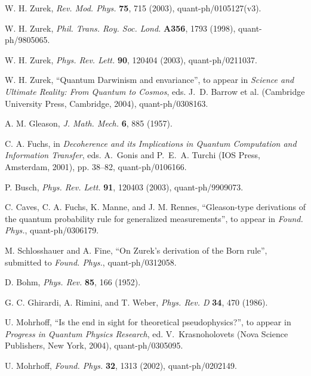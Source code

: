 \documentclass[12pt]{article}
\begin{document}
\begin{thebibliography}{00}
\setlength{\parskip}{0pt}
\vspace*{-15pt}
W. H. Zurek, {\it Rev. Mod. Phys.\/} {\bf 75}, 715 (2003), 
quant-ph/0105127(v3).

W. H. Zurek, {\it Phil. Trans. Roy. Soc. Lond.\/} {\bf A356}, 1793 (1998), 
quant-ph/9805065.

W. H. Zurek, {\it Phys. Rev. Lett.\/} {\bf 90}, 120404 (2003), 
quant-ph/0211037.

W. H. Zurek, ``Quantum Darwinism and envariance'', to appear in {\it Science 
and Ultimate Reality: From Quantum to Cosmos\/}, eds. J.~D. Barrow et al. 
(Cambridge University Press, Cambridge, 2004), quant-ph/0308163.

A. M. Gleason, {\it J. Math. Mech.\/} {\bf 6}, 885 (1957).

C. A. Fuchs, in {\it Decoherence and its Implications in Quantum Computation 
and Information Transfer\/}, eds. A.~Gonis and P.~E.~A. Turchi (IOS Press, 
Amsterdam, 2001), pp. 38--82, quant-ph/0106166.

P. Busch, {\it Phys. Rev. Lett.\/} {\bf 91}, 120403 (2003), quant-ph/9909073.

C. Caves, C. A. Fuchs, K. Manne, and J. M. Rennes, ``Gleason-type derivations of 
the quantum probability rule for generalized measurements'', to appear in {\it 
Found. Phys.\/}, quant-ph/0306179.

M. Schlosshauer and A. Fine, ``On Zurek's derivation of the Born rule'', submitted 
to {\it Found. Phys.\/}, quant-ph/0312058.

D. Bohm, {\it Phys. Rev.\/} {\bf 85}, 166 (1952).

G. C. Ghirardi, A. Rimini, and T. Weber, {\it Phys. Rev. D\/} {\bf 34}, 470 
(1986).

U. Mohrhoff, ``Is the end in sight for theoretical pseudophysics?'', to appear in 
{\it Progress in Quantum Physics Research\/}, ed. V.~Krasnoholovets (Nova 
Science Publishers, New York, 2004), quant-ph/0305095.

U. Mohrhoff, {\it Found. Phys.\/} {\bf 32}, 1313 (2002), quant-ph/0202149.


\end{thebibliography}
\end{document}
